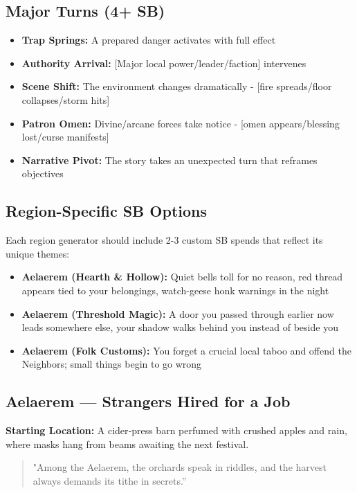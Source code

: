 \subsection*{Major Turns (4+ SB)}
\begin{itemize}
\item \textbf{Trap Springs:} A prepared danger activates with full effect
\item \textbf{Authority Arrival:} [Major local power/leader/faction] intervenes
\item \textbf{Scene Shift:} The environment changes dramatically - [fire spreads/floor collapses/storm hits]
\item \textbf{Patron Omen:} Divine/arcane forces take notice - [omen appears/blessing lost/curse manifests]
\item \textbf{Narrative Pivot:} The story takes an unexpected turn that reframes objectives
\end{itemize}

\subsection*{Region-Specific SB Options}
Each region generator should include 2-3 custom SB spends that reflect its unique themes:

\begin{itemize}
\item \textbf{Aelaerem (Hearth \& Hollow):} Quiet bells toll for no reason, red thread appears tied to your belongings, watch-geese honk warnings in the night
\item \textbf{Aelaerem (Threshold Magic):} A door you passed through earlier now leads somewhere else, your shadow walks behind you instead of beside you
\item \textbf{Aelaerem (Folk Customs):} You forget a crucial local taboo and offend the Neighbors; small things begin to go wrong
\end{itemize}

\subsection*{Aelaerem — Strangers Hired for a Job}
\textbf{Starting Location:} A cider‑press barn perfumed with crushed apples and rain, where masks hang from beams awaiting the next festival.
\begin{quote}
"Among the Aelaerem, the orchards speak in riddles, and the harvest always demands its tithe in secrets.”
\end{quote}

